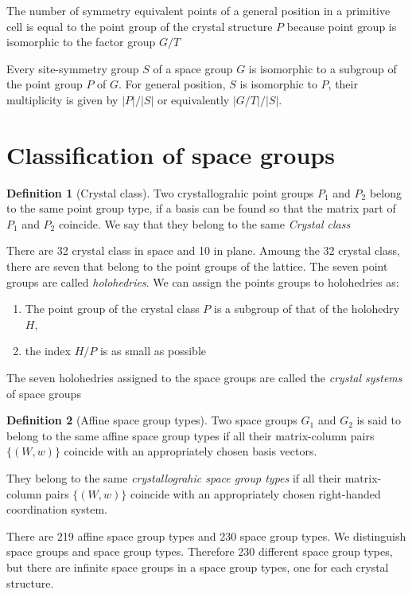 \documentclass{amsart}
\theoremstyle{remark}
\theoremstyle{remark}
\theoremstyle{definition}
\newtheorem*{definition}{Definition}
\begin{document}
The number of symmetry equivalent points of a general position in a primitive cell is equal to the point 
group of the crystal structure $P$ because point group is isomorphic to the factor group $G/T$

Every site-symmetry group $S$ of a space group $G$ is isomorphic to a subgroup of the point group $P$ of $G$. 
For general position, $S$ is isomorphic to $P$, their multiplicity is given by $|P|/|S|$ or equivalently $|G/T|/|S|$.


\vspace{10pt}
\section*{Classification of space groups}
\begin{definition}
    [Crystal class]
    Two crystallograhic point groups $P_1$ and $P_2$ belong to the same point group type, if a basis can be found 
    so that the matrix part of $P_1$ and $P_2$ coincide. We say that they belong to the same \emph{Crystal class}
\end{definition}
There are 32 crystal class in space and 10 in plane.
Amoung the 32 crystal class, there are seven that belong to the point groups of the lattice. The seven point groups 
are called \emph{holohedries}. We can assign the points groups to holohedries as:
\begin{enumerate}
    \item The point group of the crystal class $P$ is a subgroup of that of the holohedry $H$,
    \item the index $H/P$ is as small as possible
\end{enumerate}
The seven holohedries assigned to the space groups are called the \emph{crystal systems} of space groups

\vspace{10pt}

\begin{definition}
    [Affine space group types]
    Two space groups $G_1$ and $G_2$ is said to belong to the same affine space group types if 
    all their matrix-column pairs $\{(W,w)\}$ coincide with an appropriately chosen basis vectors. 
\end{definition}
They belong to the same \emph{crystallograhic space group types} if 
all their matrix-column pairs $\{(W,w)\}$ coincide with an appropriately chosen right-handed coordination system.

There are 219 affine space group types and 230 space group types. 
We distinguish space groups and space group types. Therefore 230 different space group types, but there are 
infinite space groups in a space group types, one for each crystal structure.
\end{document}
